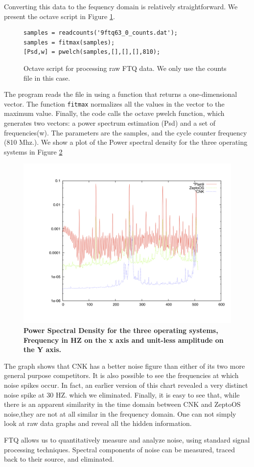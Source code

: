 Converting this data to the fequency domain is relatively straightforward. We present the octave script in Figure \ref{octave}. 
\begin{figure}[h]
\begin{center}
\begin{verbatim}
samples = readcounts('9ftq63_0_counts.dat');
samples = fitmax(samples);
[Psd,w] = pwelch(samples,[],[],[],810);
\end{verbatim}
\caption{Octave script for processing raw FTQ data. We only use the counts file in this case.}
\label{octave}
\end{center}
\end{figure}
The program reads the file in using a function that returns a one-dimensional vector. The function
{\tt fitmax} normalizes all the values in the vector to the maximum value. Finally, 
the code calls the octave pwelch function, which generates two vectors: a power spectrum estimation (Psd) and a set of frequencies(w). The parameters are the samples, and the 
cycle counter 
frequency (810 Mhz.). 
We show a plot of the Power spectral density for the three operating systems in Figure \ref{psd}
\begin{figure}[htbp]
\begin{center}
 \includegraphics[width=5in]{spectrum.jpg}
\caption{{\bf Power Spectral Density for the three operating systems, Frequency in HZ on the x axis
and unit-less amplitude on the Y axis.}}
\label{psd}
\end{center}
\end{figure}

The graph shows that CNK has a better noise figure than either of its two
more general purpose competitors. It is also possible to see
the frequencies at which noise spikes occur. In fact, an earlier version 
of this chart revealed a very distinct noise spike at 30 HZ. which we 
eliminated. Finally, it is easy to see that, while there is an apparent similarity in the time
domain between CNK and ZeptoOS noise,they are not at all similar in the
frequency domain. One can not simply look at raw data graphs and 
reveal all the hidden information. 

FTQ allows us to quantitatively measure and analyze noise, using standard 
signal processing techniques. Spectral components of noise can be measured, 
traced back to their source, and eliminated. 

